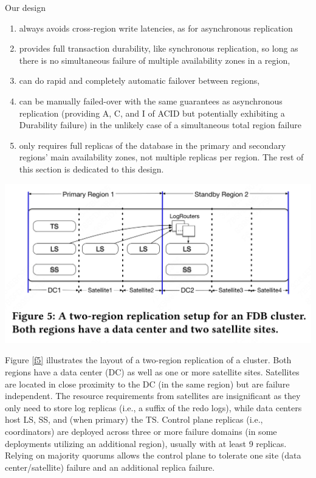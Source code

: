 \documentclass[11pt]{article}
\begin{document}
Our design
\begin{enumerate}
\item always avoids cross-region write latencies, as for asynchronous replication
\item provides full transaction durability, like synchronous replication, so long as there is no
simultaneous failure of multiple availability zones in a region,
\item can do rapid and completely automatic failover between regions,
\item can be manually failed-over with the same guarantees as asynchronous replication (providing A, C,
and I of ACID but potentially exhibiting a Durability failure) in the unlikely case of a
simultaneous total region failure
\item only requires full replicas of the database in the primary and secondary regions’ main availability
zones, not multiple replicas per region. The rest of this section is dedicated to this design.
\end{enumerate}
\begin{center}
\includegraphics[width=.6\textwidth]{../../images/papers/113.png}
\label{f5}
\end{center}

Figure \ref{f5} illustrates the layout of a two-region replication of a cluster. Both regions have a
data center (DC) as well as one or more satellite sites. Satellites are located in close proximity to
the DC (in the same region) but are failure independent. The resource requirements from satellites are
insignificant as they only need to store log replicas (i.e., a suffix of the redo logs), while data
centers host LS, SS, and (when primary) the TS. Control plane replicas (i.e., coordinators) are
deployed across three or more failure domains (in some deployments utilizing an additional region),
usually with at least 9 replicas. Relying on majority quorums allows the control plane to tolerate one
site (data center/satellite) failure and an additional replica failure.
\end{document}
